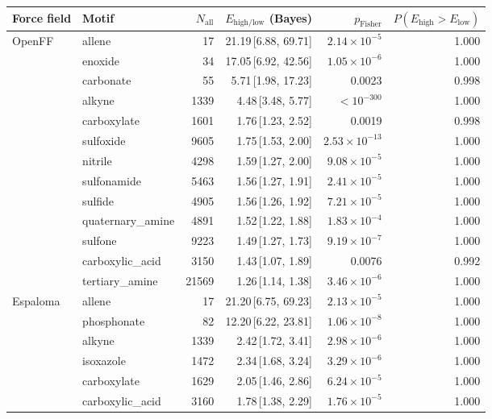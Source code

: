 \begin{table}[t]
  \centering
  \small
  \setlength{\tabcolsep}{6pt}
  \renewcommand{\arraystretch}{1.15}
  \begin{tabular}{llrrrr}
    \hline
    Force field & Motif & $N_\mathrm{all}$ & $E_{\mathrm{high/low}}$ (Bayes) & $p_\mathrm{Fisher}$ & $P(E_{\mathrm{high}}>E_{\mathrm{low}})$ \\
    \hline
    OpenFF & allene & 17 & 21.19\,[6.88, 69.71] & $2.14\times 10^{-5}$ & 1.000 \\
      & enoxide & 34 & 17.05\,[6.92, 42.56] & $1.05\times 10^{-6}$ & 1.000 \\
      & carbonate & 55 & 5.71\,[1.98, 17.23] & 0.0023 & 0.998 \\
      & alkyne & 1339 & 4.48\,[3.48, 5.77] & $< 10^{-300}$ & 1.000 \\
      & carboxylate & 1601 & 1.76\,[1.23, 2.52] & 0.0019 & 0.998 \\
      & sulfoxide & 9605 & 1.75\,[1.53, 2.00] & $2.53\times 10^{-13}$ & 1.000 \\
      & nitrile & 4298 & 1.59\,[1.27, 2.00] & $9.08\times 10^{-5}$ & 1.000 \\
      & sulfonamide & 5463 & 1.56\,[1.27, 1.91] & $2.41\times 10^{-5}$ & 1.000 \\
      & sulfide & 4905 & 1.56\,[1.26, 1.92] & $7.21\times 10^{-5}$ & 1.000 \\
      & quaternary\_amine & 4891 & 1.52\,[1.22, 1.88] & $1.83\times 10^{-4}$ & 1.000 \\
      & sulfone & 9223 & 1.49\,[1.27, 1.73] & $9.19\times 10^{-7}$ & 1.000 \\
      & carboxylic\_acid & 3150 & 1.43\,[1.07, 1.89] & 0.0076 & 0.992 \\
      & tertiary\_amine & 21569 & 1.26\,[1.14, 1.38] & $3.46\times 10^{-6}$ & 1.000 \\
    \hline
    Espaloma & allene & 17 & 21.20\,[6.75, 69.23] & $2.13\times 10^{-5}$ & 1.000 \\
      & phosphonate & 82 & 12.20\,[6.22, 23.81] & $1.06\times 10^{-8}$ & 1.000 \\
      & alkyne & 1339 & 2.42\,[1.72, 3.41] & $2.98\times 10^{-6}$ & 1.000 \\
      & isoxazole & 1472 & 2.34\,[1.68, 3.24] & $3.29\times 10^{-6}$ & 1.000 \\
      & carboxylate & 1629 & 2.05\,[1.46, 2.86] & $6.24\times 10^{-5}$ & 1.000 \\
      & carboxylic\_acid & 3160 & 1.78\,[1.38, 2.29] & $1.76\times 10^{-5}$ & 1.000 \\

\end{tabular}
\end{table}
